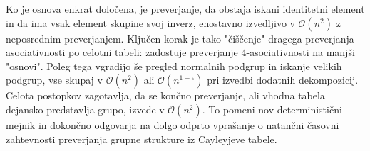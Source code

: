 Ko je osnova enkrat določena, je preverjanje, da obstaja iskani identitetni element in da ima vsak element skupine svoj inverz, enostavno izvedljivo v \(\mathcal{O}(n^2)\) z neposrednim preverjanjem. Ključen korak je tako "čiščenje" dragega preverjanja asociativnosti po celotni tabeli: zadostuje preverjanje 4-asociativnosti na manjši "osnovi". Poleg tega vgradijo še pregled normalnih podgrup in iskanje velikih podgrup, vse skupaj v \(\mathcal{O}(n^2)\) ali \(\mathcal{O}(n^{1+\epsilon})\) pri izvedbi dodatnih dekompozicij. Celota postopkov zagotavlja, da se končno preverjanje, ali vhodna tabela dejansko predstavlja grupo, izvede v \(\mathcal{O}(n^2)\). To pomeni nov deterministični mejnik in dokončno odgovarja na dolgo odprto vprašanje o natančni časovni zahtevnosti preverjanja grupne strukture iz Cayleyjeve tabele.
